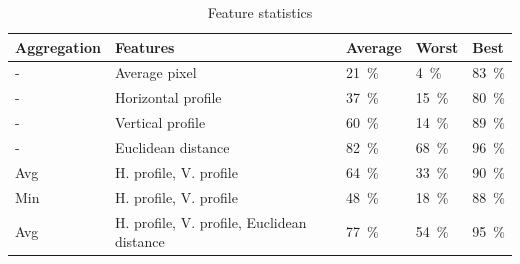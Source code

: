 \documentclass[a4paper]{scrreprt}
\begin{document}
\begin{table}
		\begin{tabular}{lllll}
				\toprule
				Aggregation & Features & Average & Worst & Best \\
				\midrule
				- & Average pixel & \SI{21}{\percent} & \SI{4}{\percent} & \SI{83}{\percent} \\
				- & Horizontal profile & \SI{37}{\percent} & \SI{15}{\percent} & \SI{80}{\percent} \\
				- & Vertical profile & \SI{60}{\percent} & \SI{14}{\percent} & \SI{89}{\percent} \\
				- & Euclidean distance & \SI{82}{\percent} & \SI{68}{\percent} & \SI{96}{\percent} \\
				Avg & H. profile, V. profile & \SI{64}{\percent} & \SI{33}{\percent} & \SI{90}{\percent} \\
				Min & H. profile, V. profile & \SI{48}{\percent} & \SI{18}{\percent} & \SI{88}{\percent} \\
				Avg & H. profile, V. profile, Euclidean distance & \SI{77}{\percent} & \SI{54}{\percent} & \SI{95}{\percent} \\
				\bottomrule
		\end{tabular}
		\label{tbl:evaluation}
		\caption{Feature statistics}
\end{table}
\end{document}
